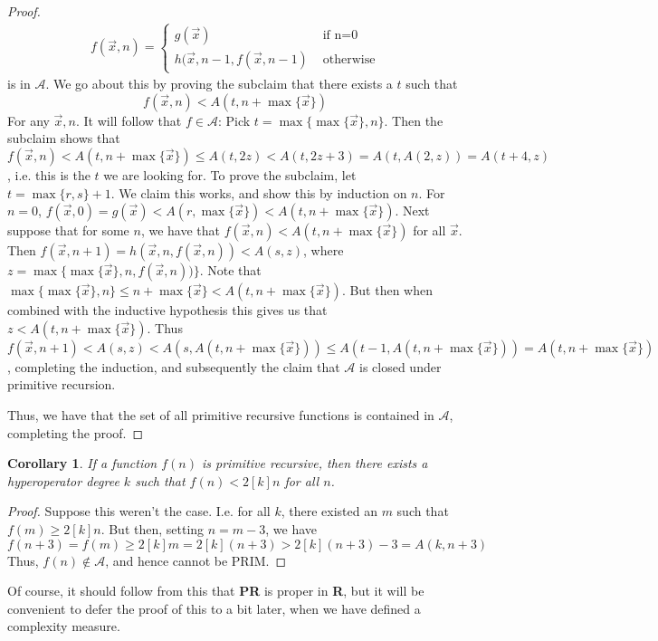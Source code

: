 \documentclass{article}
\theoremstyle{definition}
\theoremstyle{plain}
\theoremstyle{theorem}
\newtheorem{corollary}{Corollary}[section]
\begin{document}
\begin{proof}
    \begin{align}
        f(\vec{x},n) = \begin{cases}
                            g(\vec{x}) & \textrm{ if n=0} \\
                            h(\vec{x},n-1,f(\vec{x},n-1) & \textrm{ otherwise}
                       \end{cases}
    \end{align}
    is in $\mathcal{A}$. We go about this by proving the subclaim that there exists a $t$ such that
    \[ f(\vec{x},n) < A(t,n+\max\{\vec{x}\}) \]
    For any $\vec{x},n$. It will follow that $f \in \mathcal{A}$: Pick $t = \max\{\max\{\vec{x}\},n\}$. Then the subclaim shows that $f(\vec{x},n) < A(t,n+\max\{\vec{x}\}) \leq A(t,2z) < A(t,2z+3)=A(t,A(2,z))=A(t+4,z)$, i.e. this is the $t$ we are looking for. To prove the subclaim, let $t = \max\{r,s\}+1$. We claim this works, and show this by induction on $n$. For $n=0$, $f(\vec{x},0) = g(\vec{x}) < A(r,\max\{\vec{x}\}) < A(t,n+\max\{\vec{x}\})$. Next suppose that for some $n$, we have that $f(\vec{x},n) < A(t,n+\max\{\vec{x}\})$ for all $\vec{x}$. Then $f(\vec{x},n+1) = h(\vec{x},n,f(\vec{x},n)) < A(s,z)$, where $z = \max\{\max\{\vec{x}\},n,f(\vec{x},n))\}$. Note that $\max\{\max\{\vec{x}\},n\}\leq n+\max\{\vec{x}\} < A(t,n+\max\{\vec{x}\})$. But then when combined with the inductive hypothesis this gives us that $z < A(t,n+\max\{\vec{x}\})$. Thus $f(\vec{x},n+1) < A(s,z) < A(s,A(t,n+\max\{\vec{x}\})) \leq A(t-1,A(t,n+\max\{\vec{x}\}))= A(t,n+\max\{\vec{x}\})$, completing the induction, and subsequently the claim that $\mathcal{A}$ is closed under primitive recursion.
    \par Thus, we have that the set of all primitive recursive functions is contained in $\mathcal{A}$, completing the proof.
\end{proof}
\begin{corollary}
	If a function $f(n)$ is primitive recursive, then there exists a hyperoperator degree $k$ such that $f(n) < 2[k]n$ for all $n$.
\end{corollary}
\begin{proof}
	Suppose this weren't the case. I.e. for all $k$, there existed an $m$ such that $f(m) \geq 2[k]n$.  But then, setting $n = m-3$, we have 
	\[ f(n+3) = f(m) \geq 2[k]m = 2[k](n+3) > 2[k](n+3)-3 = A(k,n+3) \] Thus, $f(n) \notin \mathcal{A}$, and hence cannot be PRIM. 
\end{proof}
Of course, it should follow from this that \textbf{PR} is proper in \textbf{R}, but it will be convenient to defer the proof of this to a bit later, when we have defined a complexity measure.
\end{document}
